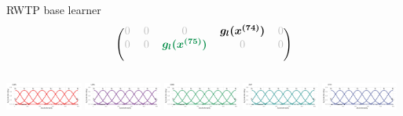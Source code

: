 \documentclass[t,10pt]{beamer}
\begin{document}
\begin{frame}{RWTP base learner}
$$\begin{blockarray}{ccccc}
\begin{block}{(ccccc)}
      \color{lightgray}0 & \color{lightgray}0 & \color{lightgray}0 & \color{black}\bm{g_l(x^{(74)})} & \color{lightgray}0 \\
      \color{lightgray}0 & \color{lightgray}0 & \color[HTML]{008B45}\bm{g_l(x^{(75)})} & \color{lightgray}0 & \color{lightgray}0 \\
      \phantom{x}\\
    \end{block}
  \end{blockarray}
  $$
  \normalsize
  {\includegraphics[width=0.19\textwidth]{figures/fig-bs0-GER.png}}
  {\includegraphics[width=0.19\textwidth]{figures/fig-bs0-USA.png}}
  {\includegraphics[width=0.19\textwidth]{figures/fig-bs0-SWE.png}}
  {\includegraphics[width=0.19\textwidth]{figures/fig-bs0-ZAF.png}}
  {\includegraphics[width=0.19\textwidth]{figures/fig-bs0-ETH.png}}
  \addtocounter{framenumber}{-1}
\end{frame}
\end{document}
